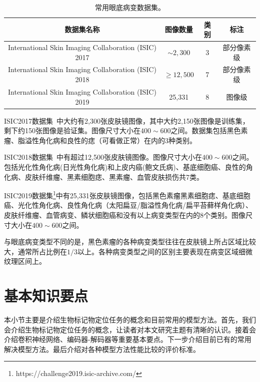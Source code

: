 \begin{table}[h]
	\centering
	\caption{常用眼底病变数据集。}		
	\label{tab:skin_datasets_info}
	\begin{tabular}{c|c|c|c}
		\toprule[2pt]
		数据集名称 & 图像数量 & 类别 & 标注 \\
		\midrule[2pt]
		
		International Skin Imaging Collaboration (ISIC) 2017 &  $\sim 2,300$ & 3 & 部分像素级 \\ \hline
		International Skin Imaging Collaboration (ISIC) 2018 & $\geq 12,500$ & 7  & 部分像素级 \\ \hline
		International Skin Imaging Collaboration (ISIC) 2019 & 25,331 & 8  & 图像级  \\ 
		\bottomrule[2pt]
	\end{tabular}
\end{table}

ISIC2017数据集~\cite{codella2018skin}中大约有2,300张皮肤镜图像，其中大约2,150张图像是训练集，剩下约150张图像是验证集。图像尺寸大小在$400\sim 600$之间。数据集包括黑色素瘤、脂溢性角化病和良性的痣（可看做正常）在内的3种类别。

ISIC2018数据集~\cite{codella2019skin, tschandl2018ham10000}中有超过12,500张皮肤镜图像。图像尺寸大小在$400\sim 600$之间。包括光化性角化病(日光性角化病)和上皮内癌(鲍文氏病)、基底细胞癌、良性的角化病、皮肤纤维瘤、黑素细胞痣、黑素瘤、血管皮肤损伤共7类。

ISIC2019数据集\footnote{https://challenge2019.isic-archive.com/}中有25,331张皮肤镜图像，包括黑色素瘤黑素细胞痣、基底细胞癌、光化性角化病、良性角化病（太阳扁豆/脂溢性角化病/扁平苔藓样角化病）、皮肤纤维瘤、血管病变、鳞状细胞癌和没有以上病变类型在内的8个类别。图像尺寸大小在$400\sim 600$之间。

与眼底病变类型不同的是，黑色素瘤的各种病变类型往往在皮肤镜上所占区域比较大，通常所占比例在$1/3$以上。各种病变类型之间的区别主要表现在病变区域细微纹理区间上。

\section{基本知识要点}
本小节主要是介绍生物标记物定位任务的概念和目前常用的模型方法。首先，我们会介绍生物标记物定位任务的概念，让读者对本文研究主题有清晰的认识。接着会介绍卷积神经网络、编码器-解码器等重要基本要点。下一步介绍目前已有的常用解决模型方法。最后介绍对各种模型方法性能比较的评价标准。
